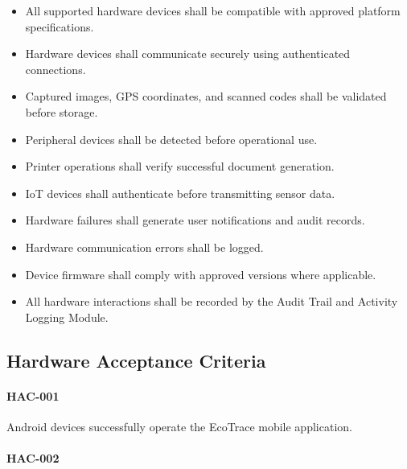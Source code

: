 \begin{itemize}

\item All supported hardware devices shall be compatible with approved
platform specifications.

\item Hardware devices shall communicate securely using authenticated
connections.

\item Captured images, GPS coordinates, and scanned codes shall be
validated before storage.

\item Peripheral devices shall be detected before operational use.

\item Printer operations shall verify successful document generation.

\item IoT devices shall authenticate before transmitting sensor data.

\item Hardware failures shall generate user notifications and audit
records.

\item Hardware communication errors shall be logged.

\item Device firmware shall comply with approved versions where
applicable.

\item All hardware interactions shall be recorded by the Audit Trail
and Activity Logging Module.

\end{itemize}


\subsection*{Hardware Acceptance Criteria}

\paragraph{HAC-001}

Android devices successfully operate the EcoTrace mobile application.

\paragraph{HAC-002}

